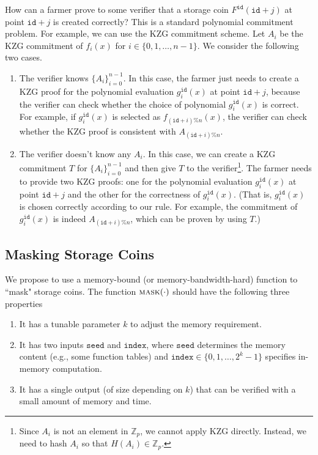 \documentclass[12pt,draftcls,onecolumn]{IEEEtran}
\newcommand{\Fp}{\mathbb{Z}_p}
\newcommand{\id}{\texttt{id}}
\newcommand{\seed}{\texttt{seed}}
\newcommand{\ind}{\texttt{index}}
\newcommand{\mask}{\textsc{mask}}
\begin{document}
How can a farmer prove to some verifier that a storage coin $F^{\id}(\id + j)$ at point $\id + j$ is created correctly? This is a standard polynomial commitment problem. For example, we can use the
KZG commitment scheme. Let $A_i$ be the KZG commitment of $f_i(x)$ for $i \in \{0, 1, \ldots, n-1\}$. 
We consider the following two cases.
\begin{enumerate}
    \item The verifier knows $\{ A_i \}_{i = 0}^{n - 1}$. In this case, the farmer just needs to create a KZG proof for the polynomial evaluation $g_i^{\id}(x)$ at point $\id + j$, because the verifier can check whether the choice of polynomial $g_i^{\id}(x)$ is correct. For example, if $g_i^{\id}(x)$ is selected as $f_{(\id + i)\% n}(x)$, the verifier can check whether the KZG proof is consistent with $A_{(\id + i)\% n}$. 
    \item The verifier doesn't know any $A_i$. In this case, we can create a KZG commitment $T$ for $\{ A_i \}_{i = 0}^{n - 1}$ and then give $T$ to the verifier\footnote{Since $A_i$ is not an element in $\Fp$, we cannot apply KZG directly. Instead, we need to hash $A_i$ so that $H(A_i) \in \Fp$.}.  The farmer needs to provide two KZG proofs: one for the polynomial evaluation $g_i^{\id}(x)$ at point $\id + j$ and the other for the correctness of $g_i^{\id}(x)$. (That is, $g_i^{\id}(x)$ is chosen correctly according to our rule. For example, the commitment of $g_i^{\id}(x)$ is indeed $A_{(\id + i)\% n}$, which can be proven by using $T$.)
\end{enumerate}


\subsection{Masking Storage Coins}

We propose to use a memory-bound (or memory-bandwidth-hard) function to ``mask" storage coins. The function $\mask(\cdot)$ should have the following three properties

\begin{enumerate}
    \item It has a tunable parameter $k$ to adjust the memory requirement. 
    \item It has two inputs $\seed$ and $\ind$, where $\seed$ determines the memory content (e.g., some function tables)
    and $\ind \in \{0, 1, \ldots, 2^k - 1 \}$ specifies in-memory computation.
    \item It has a single output (of size depending on $k$) that can be verified with a small amount of memory and time.
\end{enumerate}
\end{document}
